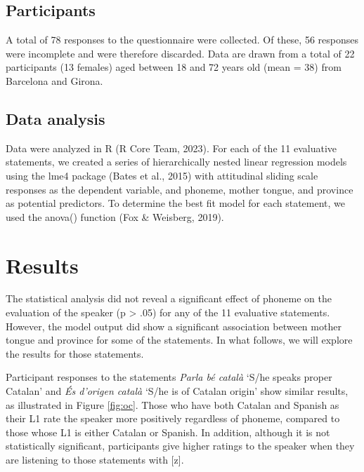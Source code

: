 \documentclass[
  a4paper,
  11pt,
  twocolumn]{article}
\begin{document}
\subsection{Participants}

A total of 78 responses to the questionnaire were collected. Of these,
56 responses were incomplete and were therefore discarded. Data are
drawn from a total of 22 participants (13 females) aged between 18 and
72 years old (mean = 38) from Barcelona and Girona.

\subsection{Data analysis}

Data were analyzed in R (R Core Team, 2023). For each of the 11
evaluative statements, we created a series of hierarchically nested
linear regression models using the lme4 package (Bates et al., 2015)
with attitudinal sliding scale responses as the dependent variable, and
phoneme, mother tongue, and province as potential predictors. To
determine the best fit model for each statement, we used the anova()
function (Fox \& Weisberg, 2019).

\section{Results}

The statistical analysis did not reveal a significant effect of phoneme
on the evaluation of the speaker (p \textgreater{} .05) for any of the
11 evaluative statements. However, the model output did show a
significant association between mother tongue and province for some of
the statements. In what follows, we will explore the results for those
statements.

Participant responses to the statements \emph{Parla bé català} `S/he
speaks proper Catalan' and \emph{És d'origen català} `S/he is of Catalan
origin' show similar results, as illustrated in Figure \ref{fig:oc}.
Those who have both Catalan and Spanish as their L1 rate the speaker
more positively regardless of phoneme, compared to those whose L1 is
either Catalan or Spanish. In addition, although it is not statistically
significant, participants give higher ratings to the speaker when they
are listening to those statements with {[}z{]}.
\end{document}
